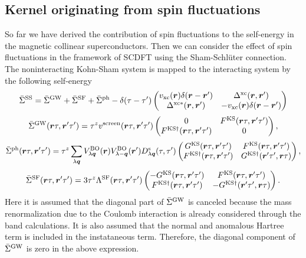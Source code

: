 \subsection{Kernel originating from spin fluctuations}
\label{kernelSF}
So far we have derived the contribution of spin fluctuations to the self-energy in the magnetic collinear superconductors.
Then we can consider the effect of spin fluctuations in the framework of SCDFT using the Sham-Schl\"{u}ter connection\cite{Sham1983,MarquesphD}.
The noninteracting Kohn-Sham system is mapped to the interacting system by the following self-energy
%
\begin{equation}
	\bar{\Sigma}^{\rm SS} = \bar{\Sigma}^{\rm GW} + \bar{\Sigma}^{\rm SF} + \bar{\Sigma}^{\rm ph}
	-\delta(\tau - \tau')  
	\begin{pmatrix}
		 v_{\rm xc}(\bm r)\delta(\bm r - \bm r')  &   \Delta^{\rm xc}(\bm r, \bm r')   \\
		 \Delta^{\rm xc\ast}(\bm r, \bm r')  & - v_{\rm xc}(\bm r)\delta(\bm r - \bm r')
	\end{pmatrix}
	\label{eq:SSself-energy}
\end{equation}
\begin{equation}
	\bar{\Sigma}^{\rm GW}(\bm r \tau, \bm r' \tau') = \tau^z v^{\rm screen}(\bm r \tau, \bm r' \tau')
	\begin{pmatrix}
		0  &   F^{\rm KS}(\bm r \tau, \bm r' \tau')   \\
		F^{\rm KS\dag}(\bm r \tau, \bm r' \tau')  & 0
	\end{pmatrix},
	\label{eq:GWself}
\end{equation}
%
\begin{equation}
	\bar{\Sigma}^{\rm ph}(\bm r \tau, \bm r' \tau') = \tau^z \sum_{\lambda \bm q}
	V^{\rm BO}_{\lambda \bm q}(\bm r)V^{\rm BO}_{\lambda -\bm q}(\bm r') D^{\rm s}_{\lambda\bm q}(\tau, \tau')
	\begin{pmatrix}
		G^{\rm KS}(\bm r \tau, \bm r' \tau')  &   F^{\rm KS}(\bm r \tau, \bm r' \tau')   \\
		F^{\rm KS\dag}(\bm r \tau, \bm r' \tau')  & G^{\rm KS\dag}(\bm r' \tau', \bm r \tau)
	\end{pmatrix},
	\label{eq:phself}
\end{equation}
%
\begin{equation}
	\bar{\Sigma}^{\rm SF}(\bm r \tau, \bm r' \tau') = 3\tau^z 
	\Lambda^{\rm SF}(\bm r \tau, \bm r' \tau')
	\begin{pmatrix}
		-G^{\rm KS}(\bm r \tau, \bm r' \tau')  &   F^{\rm KS}(\bm r \tau, \bm r' \tau')   \\
		F^{\rm KS\dag}(\bm r \tau, \bm r' \tau')  & -G^{\rm KS\dag}(\bm r' \tau', \bm r \tau)
	\end{pmatrix}.
	\label{eq:SFself}
\end{equation}
%
Here it is assumed that the diagonal part of $\bar{\Sigma}^{\rm GW}$ is canceled
because the mass renormalization due to the Coulomb interaction is already considered through the
band calculations. 
It is also assumed that the normal and anomalous Hartree term is included in the instataneous term.
Therefore, the diagonal component of $\bar{\Sigma}^{\rm GW}$ is zero in the above expression. 

